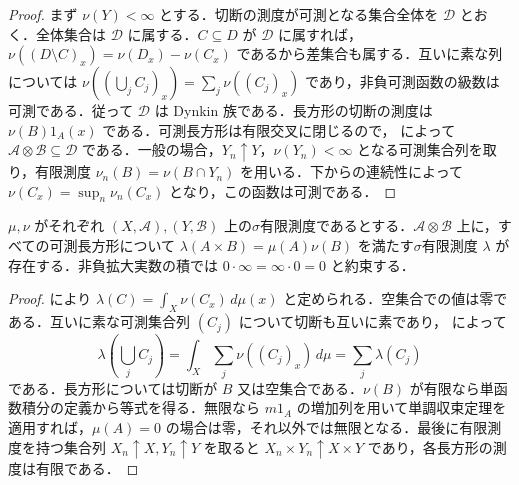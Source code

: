 \begin{proof}
まず $\nu(Y)<\infty$ とする．切断の測度が可測となる集合全体を $\mathcal D$ とおく．全体集合は $\mathcal D$ に属する．$C\subseteq D$ が $\mathcal D$ に属すれば，$\nu((D\setminus C)_x)=\nu(D_x)-\nu(C_x)$ であるから差集合も属する．互いに素な列については $\nu((\bigcup_j C_j)_x)=\sum_j\nu((C_j)_x)$ であり，非負可測函数の級数は可測である．従って $\mathcal D$ は Dynkin 族である．長方形の切断の測度は $\nu(B)1_A(x)$ である．可測長方形は有限交叉に閉じるので， によって $\mathcal A\otimes\mathcal B\subseteq\mathcal D$ である．一般の場合，$Y_n\uparrow Y$，$\nu(Y_n)<\infty$ となる可測集合列を取り，有限測度 $\nu_n(B)=\nu(B\cap Y_n)$ を用いる．下からの連続性によって $\nu(C_x)=\sup_n\nu_n(C_x)$ となり，この函数は可測である．
\end{proof}
\begin{prop}[σ有限積測度の存在]
$\mu,\nu$ がそれぞれ $(X,\mathcal A),(Y,\mathcal B)$ 上の$\sigma$有限測度であるとする．$\mathcal A\otimes\mathcal B$ 上に，すべての可測長方形について $\lambda(A\times B)=\mu(A)\nu(B)$ を満たす$\sigma$有限測度 $\lambda$ が存在する．非負拡大実数の積では $0\cdot\infty=\infty\cdot0=0$ と約束する．
\end{prop}
\begin{proof}
 により $\lambda(C)=\int_X\nu(C_x)\,d\mu(x)$ と定められる．空集合での値は零である．互いに素な可測集合列 $(C_j)$ について切断も互いに素であり， によって
\[
\lambda(\bigcup_j C_j)=\int_X\sum_j\nu((C_j)_x)\,d\mu
=\sum_j\lambda(C_j)
\]
である．長方形については切断が $B$ 又は空集合である．$\nu(B)$ が有限なら単函数積分の定義から等式を得る．無限なら $m1_A$ の増加列を用いて単調収束定理を適用すれば，$\mu(A)=0$ の場合は零，それ以外では無限となる．最後に有限測度を持つ集合列 $X_n\uparrow X,Y_n\uparrow Y$ を取ると $X_n\times Y_n\uparrow X\times Y$ であり，各長方形の測度は有限である．
\end{proof}

